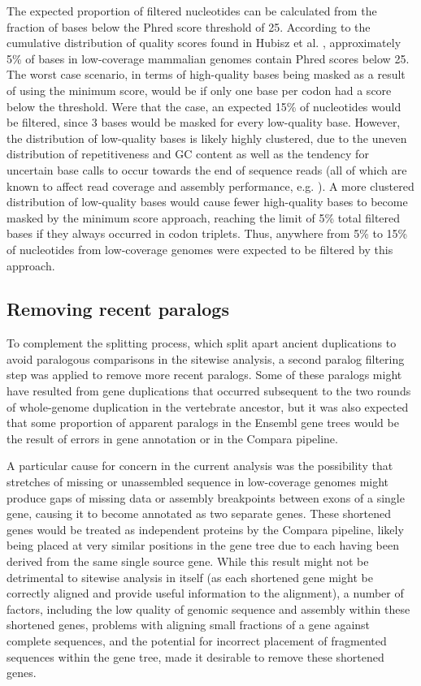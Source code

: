 The expected proportion of filtered nucleotides can be calculated from
the fraction of bases below the Phred score threshold of 25. According
to the cumulative distribution of quality scores found in Hubisz et
al. \citeyearpar{Hubisz2011}, approximately 5\% of bases in low-coverage
mammalian genomes contain Phred scores below 25. The worst case
scenario, in terms of high-quality bases being masked as a result of
using the minimum score, would be if only one base per codon had a
score below the threshold. Were that the case, an expected 15\% of
nucleotides would be filtered, since 3 bases would be masked for every
low-quality base. However, the distribution of low-quality bases is
likely highly clustered, due to the uneven distribution of
repetitiveness and GC content as well as the tendency for uncertain
base calls to occur towards the end of sequence reads (all of which
are known to affect read coverage and assembly performance,
e.g. \cite{Teytelman2009}). A more clustered
distribution of low-quality bases would cause fewer high-quality bases
to become masked by the minimum score approach, reaching the limit of
5\% total filtered bases if they always occurred in codon
triplets. Thus, anywhere from 5\% to 15\% of nucleotides from
low-coverage genomes were expected to be filtered by this approach.

\subsection{Removing recent paralogs}

To complement the \subtr{} splitting process, which split apart
ancient duplications to avoid paralogous comparisons in the sitewise
analysis, a second paralog filtering step was applied to remove more
recent paralogs. Some of these paralogs might have resulted from gene
duplications that occurred subsequent to the two rounds of
whole-genome duplication in the vertebrate ancestor, but it was also
expected that some proportion of apparent paralogs in the Ensembl gene
trees would be the result of errors in gene annotation or in the
Compara pipeline.

A particular cause for concern in the current analysis was the
possibility that stretches of missing or unassembled sequence in
low-coverage genomes might produce gaps of missing data or assembly
breakpoints between exons of a single gene, causing it to become
annotated as two separate genes. These shortened genes would be
treated as independent proteins by the Compara pipeline, likely being
placed at very similar positions in the gene tree due to each having
been derived from the same single source gene. While this result might
not be detrimental to sitewise analysis in itself (as each shortened
gene might be correctly aligned and provide useful information to the
alignment), a number of factors, including the low quality of genomic
sequence and assembly within these shortened genes, problems with
aligning small fractions of a gene against complete sequences, and the
potential for incorrect placement of fragmented sequences within the
gene tree, made it desirable to remove these shortened genes.

